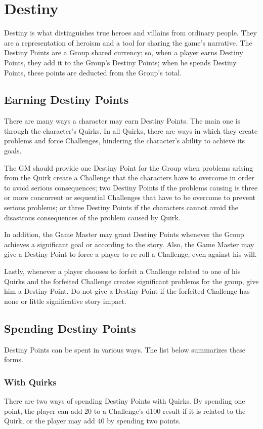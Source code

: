 \section{Destiny}
\label{sec:destiny}
\begin{multicols}{2}
Destiny is what distinguishes true heroes
and villains from ordinary people. They are a
representation of heroism and a tool for sharing
the game's narrative. The Destiny Points are a
Group shared currency; so, when a player earns
Destiny Points, they add it to the Group’s Destiny
Points; when he spends Destiny Points, these
points are deducted from the Group's total.
\subsection{Earning Destiny Points}
\label{subsec:earndp}
There are many ways a character may earn
Destiny Points. The main one is through the
character's Quirks. In all Quirks, there are ways in
which they create problems and force Challenges,
hindering the character’s ability to achieve its
goals.

The GM should provide one Destiny Point
for the Group when problems arising from the
Quirk create a Challenge that the characters have
to overcome in order to avoid serious
consequences; two Destiny Points if the problems
causing is three or more concurrent or sequential
Challenges that have to be overcome to prevent
serious problems; or three Destiny Points if the
characters cannot avoid the disastrous
consequences of the problem caused by Quirk.

In addition, the Game Master may grant
Destiny Points whenever the Group achieves a
significant goal or according to the story. Also, the
Game Master may give a Destiny Point to force a
player to re-roll a Challenge, even against his will.

Lastly, whenever a player chooses to forfeit
a Challenge related to one of his Quirks and the
forfeited Challenge creates significant problems
for the group, give him a Destiny Point. Do not give
a Destiny Point if the forfeited Challenge has none
or little significative story impact.
\subsection{Spending Destiny Points}
\label{subsec:spenddp}
Destiny Points can be spent in various
ways. The list below summarizes these forms.

\subsubsection{With Quirks}
There are two ways of spending Destiny
Points with Quirks. By spending one point, the
player can add 20 to a Challenge's d100 result if it
is related to the Quirk, or the player may add 40 by
spending two points.


\end{multicols}
